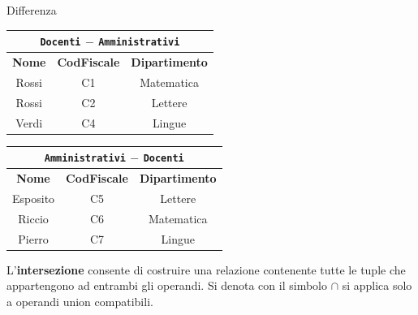 \begin{Example}{Differenza}{}
\begin{center}
        \begin{tabular}{|c|c|c|}
            \hline\multicolumn{3}{|c|}{\Verb|Docenti| $-$ \Verb|Amministrativi|}\\\hline
            \textbf{Nome} & \textbf{CodFiscale} & \textbf{Dipartimento}\\\hline
            Rossi & C1 & Matematica\\
            Rossi & C2 & Lettere\\
            Verdi & C4 & Lingue\\\hline
        \end{tabular}
        \begin{tabular}{|c|c|c|}
            \hline\multicolumn{3}{|c|}{\Verb|Amministrativi| $-$ \Verb|Docenti|}\\\hline
            \textbf{Nome} & \textbf{CodFiscale} & \textbf{Dipartimento}\\\hline
            Esposito & C5 & Lettere\\
            Riccio & C6 & Matematica\\
            Pierro & C7 & Lingue\\\hline
        \end{tabular}
    \end{center}
\end{Example}

\begin{redbar}
    L'\textbf{intersezione} consente di costruire una relazione contenente tutte le tuple che appartengono ad entrambi gli operandi. Si denota con il simbolo $\cap$ si applica solo a operandi union compatibili.
\end{redbar}

